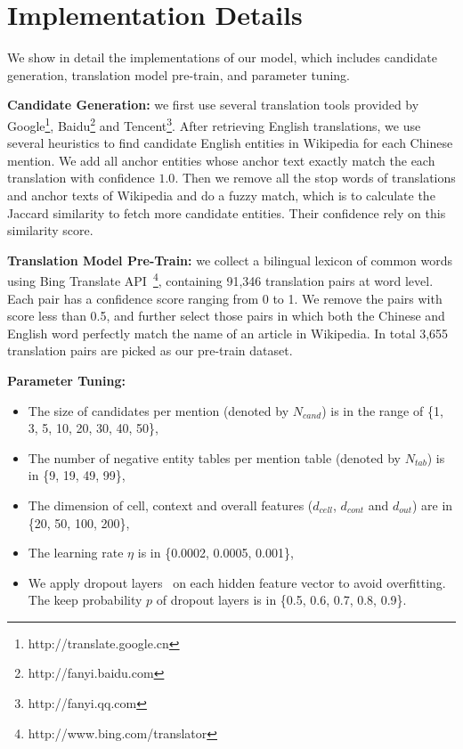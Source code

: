 \section{Implementation Details}
\label{sec:impl-detail}

We show in detail the implementations of our model, which includes candidate generation,
translation model pre-train, and parameter tuning.

\noindent
\textbf{Candidate Generation:}
we first use several translation tools provided by
Google\footnote{http://translate.google.cn},
Baidu\footnote{http://fanyi.baidu.com} and
Tencent\footnote{http://fanyi.qq.com}. 
After retrieving English translations, we use several heuristics
to find candidate English entities in Wikipedia for each Chinese mention.
We add all anchor entities whose anchor text exactly match the each translation with confidence $1.0$. Then we remove all the stop words of translations and anchor texts of Wikipedia and do a fuzzy match, which is to calculate the Jaccard similarity to fetch more candidate entities. Their confidence rely on this similarity score.

\noindent
\textbf{Translation Model Pre-Train:}
we collect a bilingual lexicon of common words using
Bing Translate API~\footnote{http://www.bing.com/translator},
containing 91,346 translation pairs at word level.
Each pair has a confidence score ranging from 0 to 1.
We remove the pairs with score less than 0.5,
and further select those pairs in which both the Chinese and English word
perfectly match the name of an article in Wikipedia.
In total 3,655 translation pairs are picked as our pre-train dataset.

\noindent
\textbf{Parameter Tuning:}
\begin{itemize}
\item The size of candidates per mention (denoted by $N_{cand}$) is
in the range of \{1, 3, 5, 10, 20, 30, 40, 50\}, 
\item The number of negative entity tables per mention table (denoted by $N_{tab}$) is in \{9, 19, 49, 99\},
\item The dimension of cell, context and overall features ($d_{cell}$, $d_{cont}$ and $d_{out}$) are in \{20, 50, 100, 200\},
\item The learning rate $\eta$ is in \{0.0002, 0.0005, 0.001\},
\item We apply dropout layers~\cite{srivastava2014dropout} on each hidden feature vector to avoid overfitting.
The keep probability $p$ of dropout layers is in \{0.5, 0.6, 0.7, 0.8, 0.9\}.
\end{itemize}



